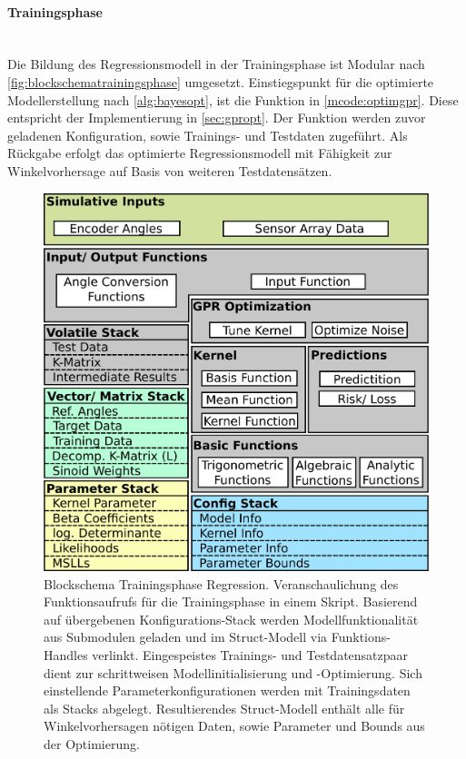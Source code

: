 \clearpage


\paragraph{Trainingsphase}\label{par:gpr-training-pro}$~$\\


Die Bildung des Regressionsmodell in der Trainingsphase ist Modular nach \autoref{fig:blockschematrainingsphase} umgesetzt. Einstiegspunkt für die optimierte Modellerstellung nach \autoref{alg:bayesopt}, ist die Funktion in \autoref{mcode:optimgpr}. Diese entspricht der Implementierung in \autoref{sec:gpropt}. Der Funktion werden zuvor geladenen Konfiguration, sowie Trainings- und Testdaten zugeführt. Als Rückgabe erfolgt das optimierte Regressionsmodell mit Fähigkeit zur Winkelvorhersage auf Basis von weiteren Testdatensätzen.


\vspace{2mm}
\begin{figure}[tbph]
	\centering
	\includegraphics[width=0.7\linewidth]{chapters/images/3-SW-E-OExp/Blockschema_Trainingsphase}
	\caption[Blockschema Trainingsphase Regression]{Blockschema Trainingsphase Regression. Veranschaulichung des Funktionsaufrufs für die Trainingsphase in einem Skript. Basierend auf übergebenen Konfigurations-Stack werden Modellfunktionalität aus Submodulen geladen und im Struct-Modell via Funktions-Handles verlinkt. Eingespeistes Trainings- und Testdatensatzpaar dient zur schrittweisen Modellinitialisierung und -Optimierung. Sich einstellende Parameterkonfigurationen werden mit Trainingsdaten als Stacks abgelegt. Resultierendes Struct-Modell enthält alle für Winkelvorhersagen nötigen Daten, sowie Parameter und Bounds aus der Optimierung.}
	\label{fig:blockschematrainingsphase}
\end{figure}


